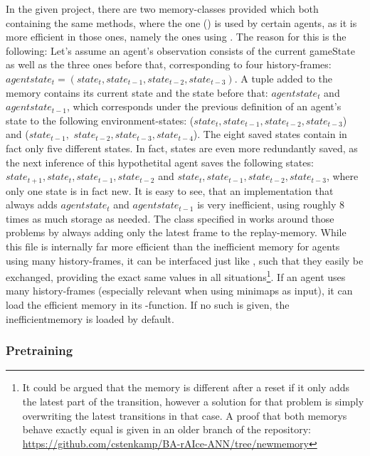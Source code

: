 In the given project, there are two memory-classes provided which both containing the same methods, where the one () is used by certain agents, as it is more efficient in those ones, namely the ones using . 
The reason for this is the following: 
Let's assume an agent's observation consists of the current gameState as well as the three ones before that, corresponding to four history-frames: $agentstate_t = (state_t, state_{t-1}, state_{t-2}, state_{t-3})$. A tuple added to the memory contains its current state and the state before that: $agentstate_t$ and $agentstate_{t-1}$, which corresponds under the previous definition of an agent's state to the following environment-states: ($state_t, state_{t-1}, state_{t-2}, state_{t-3}$) and ($state_{t-1}, $ $state_{t-2}, state_{t-3}, state_{t-4}$). The eight saved states contain in fact only five different states. In fact, states are even more redundantly saved, as the next inference of this hypothetital agent saves the following states: 
$state_{t+1}, state_{t}, state_{t-1}, state_{t-2}$ and $state_{t}, state_{t-1}, state_{t-2}, state_{t-3}$, where only one state is in fact new. It is easy to see, that an implementation that always adds $agentstate_t$ and $agentstate_{t-1}$ is very inefficient, using roughly 8 times as much storage as needed. The class specified in  works around those problems by always adding only the latest frame to the replay-memory. While this file is internally far more efficient than the inefficient memory for agents using many history-frames, it can be interfaced just like , such that they easily be exchanged, providing the exact same values in all situations\footnote{It could be argued that the memory is different after a reset if it only adds the latest part of the transition, however a solution for that problem is simply overwriting the latest transitions in that case. A proof that both memorys behave exactly equal is given in an older branch of the repository: \url{https://github.com/cstenkamp/BA-rAIce-ANN/tree/newmemory}}.
If an agent uses many history-frames (especially relevant when using minimaps as input), it can load the efficient memory in its -function. If no such is given, the inefficientmemory is loaded by default. 

\subsubsection{Pretraining}


